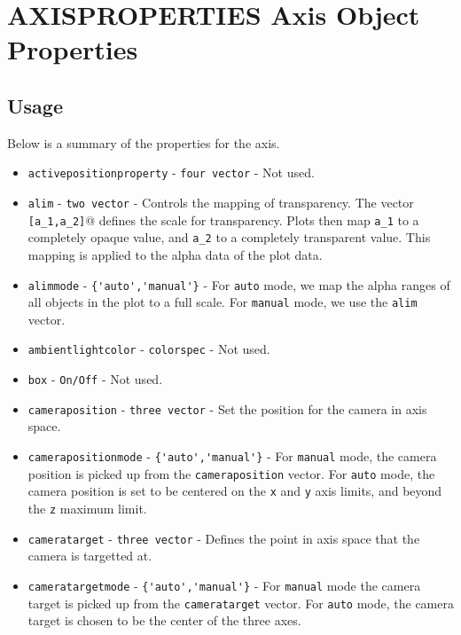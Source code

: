 \section{AXISPROPERTIES Axis Object Properties}

\subsection{Usage}

Below is a summary of the properties for the axis. 
\begin{itemize}
\item  \verb|activepositionproperty| - \verb|four vector| - Not used.

\item  \verb|alim| - \verb|two vector| - Controls the mapping of 
 transparency.  The vector \verb|[a_1,a_2]|@ defines the scale for transparency.
 Plots then map \verb|a_1| to a completely opaque value, and \verb|a_2| to a 
 completely transparent value.  This mapping is applied to the alpha
 data of the plot data.

\item  \verb|alimmode| - \verb|{'auto','manual'}| - For \verb|auto| mode, we 
 map the alpha ranges of all objects in the plot to a full scale.
 For \verb|manual| mode, we use the \verb|alim| vector.

\item  \verb|ambientlightcolor| - \verb|colorspec| - Not used.

\item  \verb|box| - \verb|On/Off| - Not used.

\item  \verb|cameraposition| - \verb|three vector| - Set the position for the
 camera in axis space.

\item  \verb|camerapositionmode| - \verb|{'auto','manual'}| - For \verb|manual|
 mode, the camera position is picked up from the \verb|cameraposition| vector.
 For \verb|auto| mode, the camera position is set to be centered on the 
 \verb|x| and \verb|y| axis limits, and beyond the \verb|z| maximum limit.

\item  \verb|cameratarget| - \verb|three vector| - Defines the point in axis
 space that the camera is targetted at.

\item  \verb|cameratargetmode| - \verb|{'auto','manual'}| - For \verb|manual|
 mode the camera target is picked up from the \verb|cameratarget| vector.  For
 \verb|auto| mode, the camera target is chosen to be the center of the 
 three axes.


\end{itemize}
